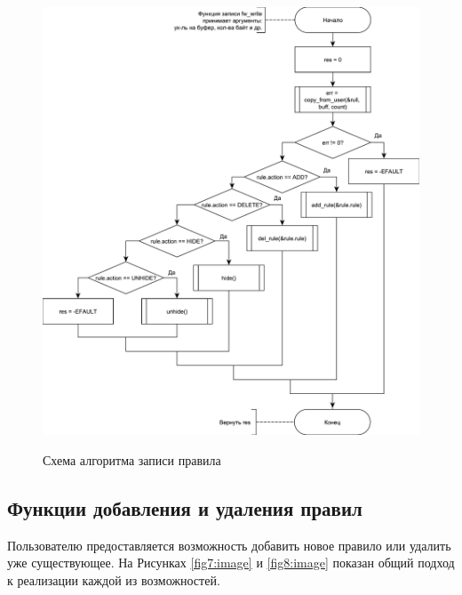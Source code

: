 \begin{figure}[h!]
	\begin{center}
		{\includegraphics[scale = 0.6]{img/write.pdf}}
		\caption{Схема алгоритма записи правила}
		\label{fig6:image}
	\end{center}
\end{figure}

\newpage

\subsection{Функции добавления и удаления правил}
Пользователю предоставляется возможность добавить новое правило или удалить уже существующее. На Рисунках \ref{fig7:image} и \ref{fig8:image} показан общий подход к реализации каждой из возможностей.

